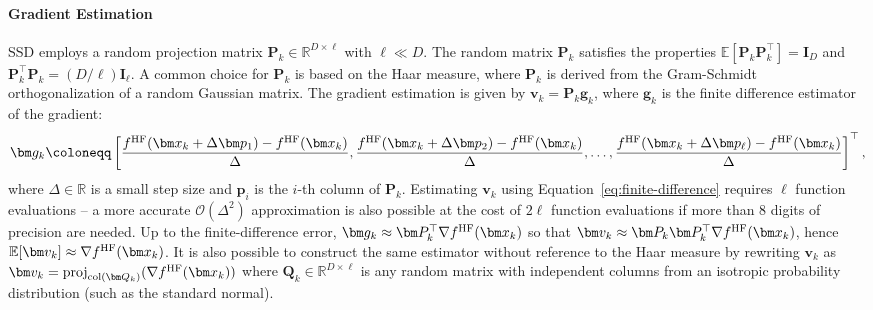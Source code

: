 \documentclass[10pt]{article} %
\numberwithin{equation}{section}
\theoremstyle{plain}
\theoremstyle{definition}
\newcommand{\<}{\langle}
\renewcommand{\>}{\rangle}
\renewcommand{\(}{\left(}
\renewcommand{\)}{\right)}
\renewcommand{\[}{\left[}
\renewcommand{\]}{\right]}
\def\R{{\mathbb R}}
\def\E{{\mathbb E}}
\def\R{{\mathbb R}}
\newcommand{\HF}{\textup{HF}}
\begin{document}
\paragraph{Gradient Estimation}
SSD employs a random projection matrix $\bm P_k \in \R^{D \times \ell}$ with $\ell \ll D$. The random matrix $\bm P_k$ satisfies the properties $\E[\bm P_k \bm P_k^\top] = \bm I_D$ and $\bm P_k^\top \bm P_k = (D/\ell)\bm I_\ell$. A common choice for $\bm P_k$ is based on the Haar measure, where $\bm P_k$ is derived from the Gram-Schmidt orthogonalization of a random Gaussian matrix. The gradient estimation is given by $\bm v_k = \bm P_k \bm g_k$, where $\bm g_k$ is the finite difference estimator of the gradient:
\begin{equation}
\label{eq:finite-difference}
    \bm g_k \coloneqq \left[ \frac{f^\HF(\bm x_k + \Delta \bm p_1) - f^\HF(\bm x_k)}{\Delta}, \frac{f^\HF(\bm x_k + \Delta \bm p_2) - f^\HF(\bm x_k)}{\Delta}, \ldots, \frac{f^\HF(\bm x_k + \Delta \bm p_\ell) - f^\HF(\bm x_k)}{\Delta} \right]^\top,
\end{equation}
where $\Delta\in\R$ is a small step size and $\bm p_i$ is the $i$-th column of $\bm P_k$. Estimating $\bm v_k$ using Equation~\eqref{eq:finite-difference} requires $\ell$ function evaluations -- a more accurate $\mathcal{O}(\Delta^2)$ approximation is also possible at the cost of $2\ell$ function evaluations if more than 8 digits of precision are needed. Up to the finite-difference error, $\bm g_k \approx \bm P_k^\top \nabla f^\HF(\bm x_k)$ so that $\bm v_k \approx \bm P_k \bm P_k^\top \nabla f^\HF(\bm x_k)$, hence $\mathbb{E}[\bm v_k] \approx \nabla f^\HF(\bm x_k)$.  It is also possible to construct the same estimator without reference to the Haar measure by rewriting $\bm v_k$ as $\bm v_k = \text{proj}_{\text{col}(\bm Q_k)}( \nabla f^\HF(\bm x_k) )$ where $\bm Q_k\in \R^{D \times \ell}$ is any random matrix with independent columns from an isotropic probability distribution (such as the standard normal).
\end{document}
